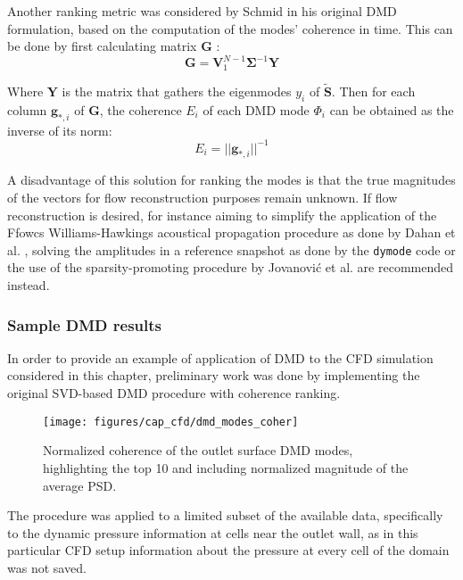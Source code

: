 Another ranking metric was considered by Schmid \cite{schmid2010dynamic} in his original DMD formulation, based on the computation of the modes' coherence in time. This can be done by first calculating matrix $\mathbf G$ \cite{delorne2014dynamic}:
\begin{equation}
	\mathbf G=\mathbf V_1^{N-1}\bm\Sigma^{-1} \mathbf Y
\end{equation}

Where $\mathbf Y$ is the matrix that gathers the eigenmodes $y_i$ of $\widetilde{\mathbf{S}}$. Then for each column $\mathbf g_{*,i}$ of $\mathbf G$, the coherence $E_i$ of each DMD mode $\Phi_i$ can be obtained as the inverse of its norm:
\begin{equation}
	E_i = ||\mathbf g_{*,i}||^{-1}
\end{equation}

A disadvantage of this solution for ranking the modes is that the true magnitudes of the vectors for flow reconstruction purposes remain unknown. If flow reconstruction is desired, for instance aiming to simplify the application of the Ffowcs Williams-Hawkings acoustical propagation procedure \cite{williams1969sound} as done by Dahan et al. \cite{dahan2014aero}, solving the amplitudes in a reference snapshot as done by the \texttt{dymode} code \cite{futrzynski2015dymode} or the use of the sparsity-promoting procedure by Jovanovi{\'c} et al. \cite{jovanovic2014sparsity} are recommended instead.

\subsubsection{Sample DMD results}

In order to provide an example of application of DMD to the CFD simulation considered in this chapter, preliminary work was done by implementing the original SVD-based DMD procedure with coherence ranking.

\begin{figure}[b!]
\centering
\texttt{[image: figures/cap\_cfd/dmd\_modes\_coher]}
\caption{Normalized coherence of the outlet surface DMD modes, highlighting the top 10 and including normalized magnitude of the average PSD.}
\label{fig:dmd_modes_coher}
\end{figure}

The procedure was applied to a limited subset of the available data, specifically to the dynamic pressure information at cells near the outlet wall, as in this particular CFD setup information about the pressure at every cell of the domain was not saved. 

